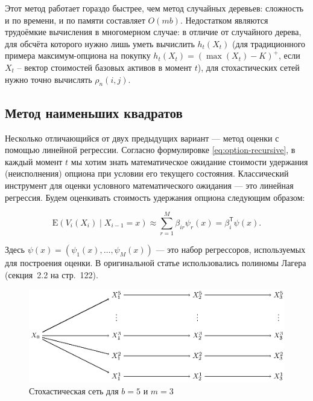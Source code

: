 \documentclass[specialist,
               substylefile = ../spbu.rtx,
               subf,href,colorlinks=true, 10pt]{disser}
\newcommand{\E}{\mathrm{E}}
\begin{document}
Этот метод работает гораздо быстрее, чем метод случайных деревьев: сложность и по времени, и по памяти составляет $O(mb)$. Недостатком являются трудоёмкие вычисления в многомерном случае: в отличие от случайного дерева, для обсчёта которого нужно лишь уметь вычислить $h_t(X_t)$ (для традиционного примера максимум-опциона на покупку $h_t(X_t) = \left(\max(X_t) - K\right)^+$, если $X_t$ -- вектор стоимостей базовых активов в момент $t$), для стохастических сетей нужно точно вычислять $\rho_n(i, j)$.


\subsection{Метод наименьших квадратов} %
\label{sub:least_squares}

Несколько отличающийся от двух предыдущих вариант --- метод оценки с помощью линейной регрессии. Согласно формулировке \eqref{eq:option-recursive}, в каждый момент $t$ мы хотим знать математическое ожидание стоимости удержания (неисполнения) опциона при условии его текущего состояния. Классический инструмент для оценки условного математического ожидания --- это линейная регрессия. Будем оценкивать стоимость удержания опциона следующим образом:

$$\E\left(V_i(X_i)\middle\vert X_{i-1} = x\right) \approx \sum_{r=1}^M \beta_{ir} \psi_r(x) = \beta_i^\mathsf{T}\psi(x).$$

Здесь $\psi(x) = \left(\psi_1(x), \dots, \psi_M(x)\right)$ --- это набор регрессоров, используемых для построения оценки. В оригинальной статье \cite{Longstaff2001} использовались полиномы Лагера (секция~2.2 на стр.~122).

\begin{figure}[h]
    \centering
	\includegraphics{stohastic_mesh_vector_phase_0.eps}
	\caption{Стохастическая сеть для $b = 5$ и $m = 3$}
	\label{fig:least_squares}
\end{figure}
\end{document}

